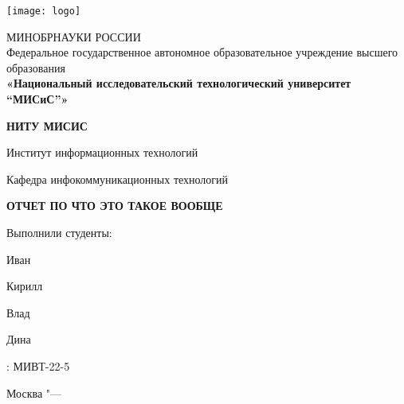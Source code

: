 \thispagestyle{empty}

\begin{center}
      \texttt{[image: logo]}
\end{center}
\begin{center}
МИНОБРНАУКИ РОССИИ \\
\smallskip
Федеральное государственное автономное образовательное учреждение
высшего образования
\\
\textbf{«Национальный исследовательский технологический университет “МИСиС”»}
\bigskip

\textbf{\Large НИТУ МИСИС}

\noindent\hrulefill

\smallskip

Институт информационных технологий

Кафедра инфокоммуникационных технологий
\end{center}
%

\vspace{0pt plus1fill} %
\begin{center}
\textbf {\large %
ОТЧЕТ ПО ЧТО ЭТО ТАКОЕ ВООБЩЕ}
\end{center}
\vspace{0pt plus2fill} %
Выполнили студенты:

 Иван

 Кирилл

 Влад 

 Дина 

: МИВТ-22-5

\vspace{0pt plus4fill} %
{\centering Москва "--- \thesisYear\par}
